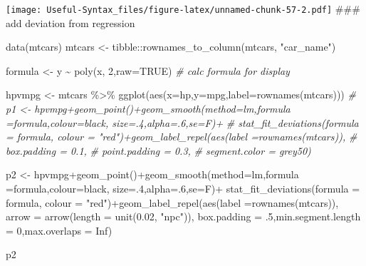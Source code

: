 \documentclass[
]{article}
\newenvironment{Shaded}{\begin{snugshade}}{\end{snugshade}}
\newcommand{\AttributeTok}[1]{\textcolor[rgb]{0.77,0.63,0.00}{#1}}
\newcommand{\CommentTok}[1]{\textcolor[rgb]{0.56,0.35,0.01}{\textit{#1}}}
\newcommand{\ConstantTok}[1]{\textcolor[rgb]{0.00,0.00,0.00}{#1}}
\newcommand{\DecValTok}[1]{\textcolor[rgb]{0.00,0.00,0.81}{#1}}
\newcommand{\FloatTok}[1]{\textcolor[rgb]{0.00,0.00,0.81}{#1}}
\newcommand{\FunctionTok}[1]{\textcolor[rgb]{0.00,0.00,0.00}{#1}}
\newcommand{\NormalTok}[1]{#1}
\newcommand{\OtherTok}[1]{\textcolor[rgb]{0.56,0.35,0.01}{#1}}
\newcommand{\SpecialCharTok}[1]{\textcolor[rgb]{0.00,0.00,0.00}{#1}}
\newcommand{\StringTok}[1]{\textcolor[rgb]{0.31,0.60,0.02}{#1}}
\begin{document}
\texttt{[image: Useful-Syntax\_files/figure-latex/unnamed-chunk-57-2.pdf]}
\#\#\# add deviation from regression

\begin{Shaded}
\begin{Highlighting}[]
\FunctionTok{data}\NormalTok{(mtcars)}
\NormalTok{mtcars }\OtherTok{\textless{}{-}}\NormalTok{ tibble}\SpecialCharTok{::}\FunctionTok{rownames\_to\_column}\NormalTok{(mtcars, }\StringTok{"car\_name"}\NormalTok{)}
\end{Highlighting}
\end{Shaded}

\begin{Shaded}
\begin{Highlighting}[]
\NormalTok{formula }\OtherTok{\textless{}{-}}\NormalTok{ y }\SpecialCharTok{\textasciitilde{}} \FunctionTok{poly}\NormalTok{(x, }\DecValTok{2}\NormalTok{,}\AttributeTok{raw=}\ConstantTok{TRUE}\NormalTok{) }\CommentTok{\# calc formula for display}

\NormalTok{hpvmpg }\OtherTok{\textless{}{-}}\NormalTok{ mtcars }\SpecialCharTok{\%\textgreater{}\%} \FunctionTok{ggplot}\NormalTok{(}\FunctionTok{aes}\NormalTok{(}\AttributeTok{x=}\NormalTok{hp,}\AttributeTok{y=}\NormalTok{mpg,}\AttributeTok{label=}\FunctionTok{rownames}\NormalTok{(mtcars)))}
\CommentTok{\# p1 \textless{}{-} hpvmpg+geom\_point()+geom\_smooth(method=\textquotesingle{}lm\textquotesingle{},formula =formula,colour=\textquotesingle{}black\textquotesingle{}, size=.4,alpha=.6,se=F)+}
\CommentTok{\#   stat\_fit\_deviations(formula = formula, colour = "red")+geom\_label\_repel(aes(label =rownames(mtcars)),}
\CommentTok{\#                   box.padding   = 0.1, }
\CommentTok{\#                   point.padding = 0.3,}
\CommentTok{\#                   segment.color = \textquotesingle{}grey50\textquotesingle{})}

\NormalTok{p2 }\OtherTok{\textless{}{-}}\NormalTok{ hpvmpg}\SpecialCharTok{+}\FunctionTok{geom\_point}\NormalTok{()}\SpecialCharTok{+}\FunctionTok{geom\_smooth}\NormalTok{(}\AttributeTok{method=}\StringTok{\textquotesingle{}lm\textquotesingle{}}\NormalTok{,}\AttributeTok{formula =}\NormalTok{formula,}\AttributeTok{colour=}\StringTok{\textquotesingle{}black\textquotesingle{}}\NormalTok{, }\AttributeTok{size=}\NormalTok{.}\DecValTok{4}\NormalTok{,}\AttributeTok{alpha=}\NormalTok{.}\DecValTok{6}\NormalTok{,}\AttributeTok{se=}\NormalTok{F)}\SpecialCharTok{+}
  \FunctionTok{stat\_fit\_deviations}\NormalTok{(}\AttributeTok{formula =}\NormalTok{ formula, }\AttributeTok{colour =} \StringTok{"red"}\NormalTok{)}\SpecialCharTok{+}\FunctionTok{geom\_label\_repel}\NormalTok{(}\FunctionTok{aes}\NormalTok{(}\AttributeTok{label =}\FunctionTok{rownames}\NormalTok{(mtcars)),}
    \AttributeTok{arrow =} \FunctionTok{arrow}\NormalTok{(}\AttributeTok{length =} \FunctionTok{unit}\NormalTok{(}\FloatTok{0.02}\NormalTok{, }\StringTok{"npc"}\NormalTok{)),}
    \AttributeTok{box.padding =}\NormalTok{ .}\DecValTok{5}\NormalTok{,}\AttributeTok{min.segment.length =} \DecValTok{0}\NormalTok{,}\AttributeTok{max.overlaps =} \ConstantTok{Inf}\NormalTok{)}

\NormalTok{ p2}
\end{Highlighting}
\end{Shaded}
\end{document}
